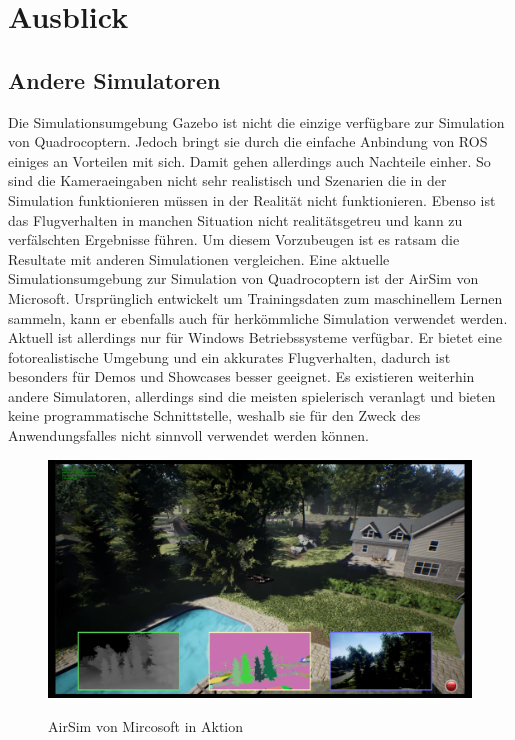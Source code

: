 \section{Ausblick}
\subsection{Andere Simulatoren}
Die Simulationsumgebung Gazebo ist nicht die einzige verfügbare zur Simulation von Quadrocoptern. Jedoch bringt sie durch die einfache Anbindung von ROS einiges an Vorteilen mit sich. Damit gehen allerdings auch Nachteile einher. So sind die Kameraeingaben nicht sehr realistisch und Szenarien die in der Simulation funktionieren müssen in der Realität nicht funktionieren. Ebenso ist das Flugverhalten in manchen Situation nicht realitätsgetreu und kann zu verfälschten Ergebnisse führen. Um diesem Vorzubeugen ist es ratsam die Resultate mit anderen Simulationen vergleichen. Eine aktuelle Simulationsumgebung zur Simulation von Quadrocoptern ist der AirSim von Microsoft.\cite{airsim} Ursprünglich entwickelt um Trainingsdaten zum maschinellem Lernen sammeln, kann er ebenfalls auch für herkömmliche Simulation verwendet werden. Aktuell ist allerdings nur für Windows Betriebssysteme verfügbar. \cite{airsimpaper} Er bietet eine fotorealistische Umgebung und ein akkurates Flugverhalten, dadurch ist besonders für Demos und Showcases besser geeignet. \newline
Es existieren weiterhin andere Simulatoren, allerdings sind die meisten spielerisch veranlagt und bieten keine programmatische Schnittstelle, weshalb sie für den Zweck des Anwendungsfalles nicht sinnvoll verwendet werden können.
\begin{figure}[ht]
	\centering
	\includegraphics[scale=0.28]{Bilder/airsim.png}
	\label{fig:airsim}
	\caption{AirSim von Mircosoft in Aktion\cite{airsim}}
\end{figure}



